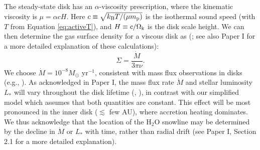\documentclass[apj]{emulateapj}
\begin{document}
The steady-state disk has an $\alpha$-viscosity prescription, where the kinematic viscosity is $\mu=\alpha c H$. Here $c \equiv \sqrt{k_{\rm B} T /(\mu m_{\rm p})}$ is the isothermal sound speed (with $T$ from Equation \ref{eq:activeT}), and $H \equiv c/\Omega_{\rm k}$ is the disk scale height. We can then determine the gas surface density for a viscous disk as (\citealt{shakura73}; see also Paper I for a more detailed explanation of these calculations):
\begin{equation}
\label{eq:Sigmaact}
\Sigma=\frac{\dot{M}}{3 \pi \nu}.
\end{equation}
We choose $\dot{M}=10^{-8} M_{\odot}$ yr$^{-1}$, consistent with mass flux observations in disks (e.g., \citealt{andrews10}). As acknowledged in Paper I, the mass flux rate $\dot{M}$ and stellar luminosity $L_*$ will vary throughout the disk lifetime (\citealt{kennedy06}, \citealt{chambers09}), in contrast with our simplified model which assumes that both quantities are constant. This effect will be most pronounced in the inner disk ($\lesssim$ few AU), where accretion heating dominates. We thus acknowledge that the location of the H$_2$O snowline may be determined by the decline in $\dot{M}$ or $L_*$ with time, rather than radial drift (see Paper I, Section 2.1 for a more detailed explanation). 

%
\end{document}
